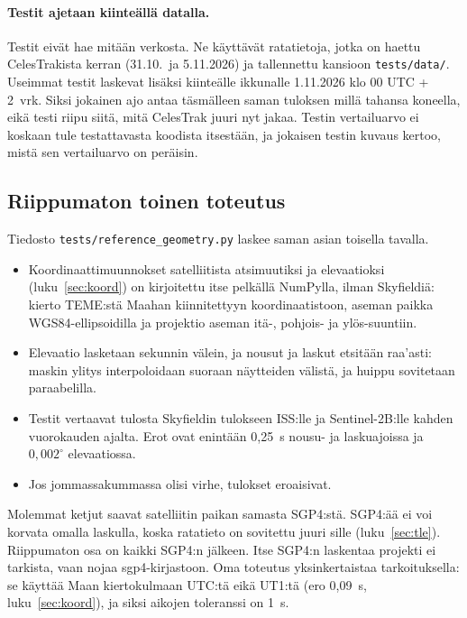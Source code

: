 \documentclass[a4paper,11pt]{article}
\newcommand{\koodi}[1]{\texttt{#1}}
\begin{document}
\paragraph{Testit ajetaan kiinteällä datalla.} Testit eivät hae mitään verkosta. Ne
käyttävät ratatietoja, jotka on haettu CelesTrakista kerran (31.10.\ ja 5.11.2026) ja
tallennettu kansioon \koodi{tests/data/}. Useimmat testit laskevat lisäksi kiinteälle
ikkunalle 1.11.2026 klo 00 UTC + 2~vrk. Siksi jokainen ajo antaa täsmälleen saman tuloksen
millä tahansa koneella, eikä testi riipu siitä, mitä CelesTrak juuri nyt jakaa. Testin
vertailuarvo ei koskaan tule testattavasta koodista itsestään, ja jokaisen testin kuvaus
kertoo, mistä sen vertailuarvo on peräisin.

\subsection{Riippumaton toinen toteutus}
Tiedosto \koodi{tests/reference\_geometry.py} laskee saman asian toisella tavalla.
\begin{itemize}
  \item Koordinaattimuunnokset satelliitista atsimuutiksi ja elevaatioksi (luku~\ref{sec:koord})
    on kirjoitettu itse pelkällä NumPylla, ilman Skyfieldiä: kierto TEME:stä Maahan
    kiinnitettyyn koordinaatistoon, aseman paikka WGS84-ellipsoidilla ja projektio aseman
    itä-, pohjois- ja ylös-suuntiin.
  \item Elevaatio lasketaan sekunnin välein, ja nousut ja laskut etsitään raa'asti: maskin
    ylitys interpoloidaan suoraan näytteiden välistä, ja huippu sovitetaan paraabelilla.
  \item Testit vertaavat tulosta Skyfieldin tulokseen ISS:lle ja Sentinel-2B:lle kahden
    vuorokauden ajalta. Erot ovat enintään 0,25~s nousu- ja laskuajoissa ja $0{,}002^\circ$
    elevaatiossa.
  \item Jos jommassakummassa olisi virhe, tulokset eroaisivat.
\end{itemize}
Molemmat ketjut saavat satelliitin paikan samasta SGP4:stä. SGP4:ää ei voi korvata
omalla laskulla, koska ratatieto on sovitettu juuri sille (luku~\ref{sec:tle}).
Riippumaton osa on kaikki SGP4:n jälkeen. Itse SGP4:n laskentaa projekti ei tarkista,
vaan nojaa sgp4-kirjastoon. Oma toteutus yksinkertaistaa tarkoituksella: se käyttää
Maan kiertokulmaan UTC:tä eikä UT1:tä (ero 0,09~s, luku~\ref{sec:koord}), ja siksi
aikojen toleranssi on 1~s.
\end{document}
